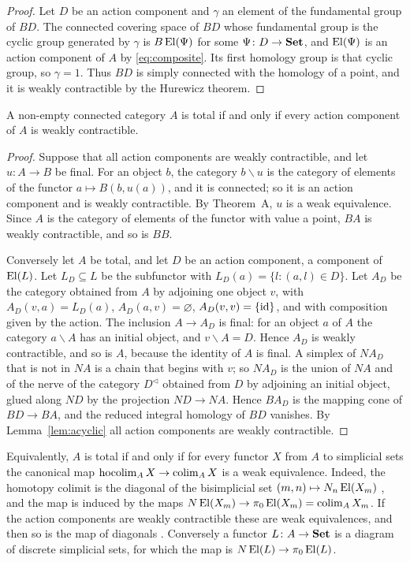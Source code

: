 \begin{proof}
Let $D$ be an action component and $\gamma$ an element of the fundamental
group of $BD$. The connected covering space of $BD$ whose fundamental group
is the cyclic group generated by $\gamma$ is $B\operatorname{El}(\Psi)$ for some
$\Psi\colon D\to\mathbf{Set}$, and $\operatorname{El}(\Psi)$ is an action component of $A$ by
\eqref{eq:composite}. Its first homology group is that cyclic group, so
$\gamma=1$. Thus $BD$ is simply connected with the homology of a point, and
it is weakly contractible by the Hurewicz theorem.
\end{proof}

\begin{proposition}\label{prop:total}
A non-empty connected category $A$ is total if and only if every action
component of $A$ is weakly contractible.
\end{proposition}

\begin{proof}
Suppose that all action components are weakly contractible, and let
$u\colon A\to B$ be final. For an object $b$, the category $b\backslash u$ is
the category of elements of the functor $a\mapsto B(b,u(a))$, and it is
connected; so it is an action component and is weakly contractible. By
Theorem~A, $u$ is a weak equivalence. Since $A$ is the category of elements
of the functor with value a point, $BA$ is weakly contractible, and so is
$BB$.

Conversely let $A$ be total, and let $D$ be an action component, a component
of $\operatorname{El}(L)$. Let $L_D\subseteq L$ be the subfunctor with
$L_D(a)=\{l:(a,l)\in D\}$. Let $A_D$ be the category obtained from $A$ by
adjoining one object $v$, with $A_D(v,a)=L_D(a)$, $A_D(a,v)=\varnothing$,
$A_D(v,v)=\{\mathrm{id}\}$, and with composition given by the action. The inclusion
$A\to A_D$ is final: for an object $a$ of $A$ the category $a\backslash A$
has an initial object, and $v\backslash A=D$. Hence $A_D$ is weakly
contractible, and so is $A$, because the identity of $A$ is final. A simplex
of $NA_D$ that is not in $NA$ is a chain that begins with $v$; so $NA_D$ is
the union of $NA$ and of the nerve of the category $D^{\triangleleft}$
obtained from $D$ by adjoining an initial object, glued along $ND$ by the
projection $ND\to NA$. Hence $BA_D$ is the mapping cone of $BD\to BA$, and
the reduced integral homology of $BD$ vanishes. By Lemma~\ref{lem:acyclic}
all action components are weakly contractible.
\end{proof}

\begin{remark}\label{rem:hocolim}
Equivalently, $A$ is total if and only if for every functor $X$ from $A$ to
simplicial sets the canonical map $\operatorname{hocolim}_AX\to\operatorname{colim}_AX$ is a
weak equivalence. Indeed, the homotopy colimit is the diagonal of the
bisimplicial set $(m,n)\mapsto N_n\operatorname{El}(X_m)$ \cite[XII.5.2]{BK}, and the map
is induced by the maps $N\operatorname{El}(X_m)\to\pi_0\operatorname{El}(X_m)=\operatorname{colim}_AX_m$. If the action
components are weakly contractible these are weak equivalences, and then so is
the map of diagonals \cite[IV, Proposition~1.7]{GJ}. Conversely a functor
$L\colon A\to\mathbf{Set}$ is a diagram of discrete simplicial sets, for which the map
is $N\operatorname{El}(L)\to\pi_0\operatorname{El}(L)$.
\end{remark}

